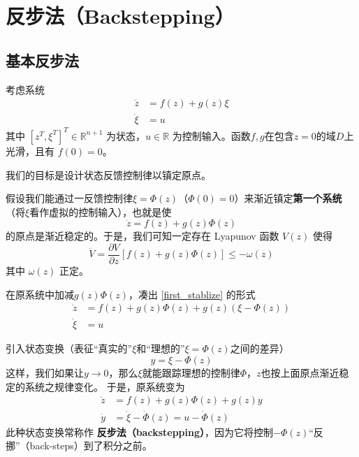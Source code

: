 \section{反步法（Backstepping）}\label{5Dref}
\subsection{基本反步法}
考虑系统
\begin{equation}
    \begin{aligned}
  \dot{z} & = f (z) + g (z) \xi\\
  \dot{\xi} & = u
\end{aligned}\label{Sys:backstep:basic:original}
\end{equation}
其中 $[z^T, \xi^T]^T \in \mathbb{R}^{n + 1}$ 为状态，$u \in
\mathbb{R}$ 为控制输入。函数$f, g$在包含$z = 0$的域$D$上光滑，且有 $f (0) = 0$。

我们的目标是设计状态反馈控制律以镇定原点。%

假设我们能通过一反馈控制律$\xi = \Phi (z)$（$\Phi (0) = 0$）来渐近镇定{\bf 第一个系统}（将$\xi$看作虚拟的控制输入），也就是使
\begin{equation}
    \dot{z} = f (z) + g (z) \Phi (z) \label{first_stablize}
\end{equation}
的原点是渐近稳定的。于是，我们可知一定存在 Lyapunov 函数 $V (z)$ 使得
\[ \dot{V} = \frac{\partial V}{\partial z} [f (z) + g (z) \Phi (z)] \leq -
   \omega (z) \]
其中 $\omega (z)$ 正定。

在原系统中加减$g (z) \Phi (z)$，凑出 \eqref{first_stablize} 的形式
\begin{equation}
   \begin{aligned}
  \dot{z} & = f (z) + g (z) \Phi (z) + g (z) (\xi - \Phi (z))\\
  \dot{\xi} & = u
\end{aligned} \label{Sys:backstep:basic:control}
\end{equation}

引入状态变换（表征“真实的”$\xi$和“理想的”$\xi=\Phi (z)$之间的差异）
\[ y = \xi - \Phi (z) \]
这样，我们如果让$y\to 0$，那么$\xi$就能跟踪理想的控制律$\Phi$，$z$也按上面原点渐近稳定的系统之规律变化。
于是，原系统变为
\begin{equation}
    \begin{aligned}
  \dot{z} & = f (z) + g (z) \Phi (z) + g (z) y\\
  \dot{y} & = \dot{\xi}-\dot{\Phi} (z) = u - \dot{\Phi} (z)
\end{aligned}\label{Sys:backstep:basic:backstep}
\end{equation}
此种状态变换常称作 {\textbf{反步法（backstepping）}}，因为它将控制$- \Phi (z)$“反挪”（back-steps）到了积分之前。

